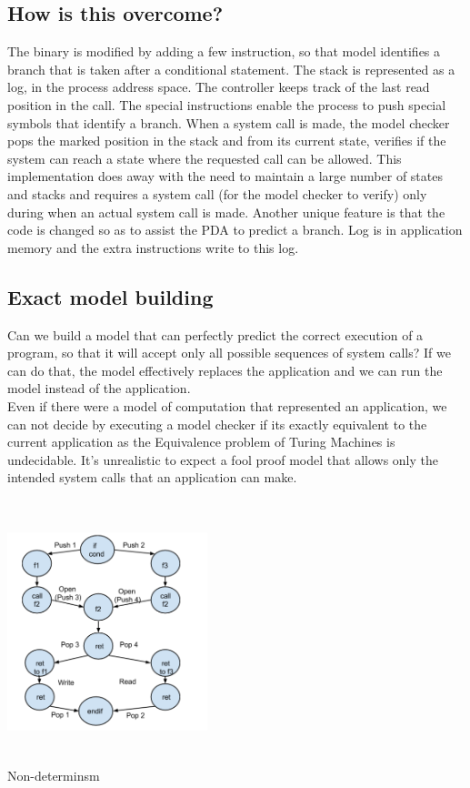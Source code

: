 \documentclass[11pt]{article} %
\begin{document}
\subsection{How is this overcome?}
The binary is modified by adding a few instruction, so that model identifies a
branch that is taken after a conditional statement. The stack is represented as
a log, in the process address space. The controller keeps track of the last read
position in the call. The special instructions enable the process to push special
symbols that identify a branch. When a system call is made, the model checker pops
the marked position in the stack and from its current state, verifies if the
system can reach a state where the requested call can be allowed. This implementation
does away with the need to maintain a large number of states and stacks and
requires a system call (for the model checker to verify) only during when an
actual system call is made. Another unique feature is that the code is changed 
so as to assist the PDA to predict a branch. Log is in application memory and the
extra instructions write to this log.

\subsection {Exact model building}
Can we build a model that can perfectly predict the correct execution of a
program, so that it will accept only all possible sequences of system calls? 
If we can do that, the model effectively replaces the application and we can run
the model instead of the application.\\

Even if there were a model of computation that represented an application, we can
not decide by executing a model checker if its exactly equivalent to the current
application as the Equivalence problem of Turing Machines is undecidable.
It's unrealistic to expect a fool proof model that allows only the intended
system calls that an application can make.

\begin {center}
\includegraphics [width=220px,height=290px] {img/img3.png}\\
\caption {Non-determinsm}
\end {center}
\end{document}
